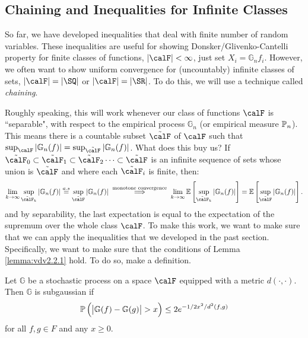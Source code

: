 \subsection{Chaining and Inequalities for Infinite Classes}%

So far, we have developed inequalities that deal with finite number of random variables. These inequalities are useful for showing Donsker/Glivenko-Cantelli property for finite classes of functions, \(|\calF|<\infty\), just set \(X_i = \mathbb{G}_nf_i\). However, we often want to show uniform convergence for (uncountably) infinite classes of sets, \(|\calF| = |\SQ|\) or  \(|\calF|=|\SR|\). To do this, we will use a technique called \textit{chaining}. 

Roughly speaking, this will work whenever our class of functions \(\calF\) is ``separable", with respect to the empirical process \(\mathbb{G}_n\) (or empirical measure \(\P_n\)). This means there is a countable subset \(\tilde\calF\) of  \(\calF\)   such that \(\sup_\calF |\mathbb{G}_n(f)| = \sup_{\tilde\calF} |\mathbb{G}_n(f)|\). What does this buy us? If \(\tilde\calF_0\subset\tilde\calF_1\subset\tilde\calF_2 \dots \subset\tilde\calF\) is an infinite sequence of sets whose union is \(\tilde\calF\) and where each \(\tilde\calF_i\) is finite, then:
 \[
	 \lim_{k\to\infty} \sup_{\tilde\calF_k}|\mathbb{G}_n(f)| \overset{a.s}{=} \sup_{\tilde\calF} |\mathbb{G}_n(f)|\; \overset{\text{monotone convergence}}{\implies}\;\lim_{k\to\infty} \E\left[\sup_{\tilde\calF_k}|\mathbb{G}_n(f)|\right]=\E\left[\sup_{\tilde\calF}|\mathbb{G}_n(f)|\right]
.\] 
and by separability, the last expectation is equal to the expectation of the supremum over the whole class \(\calF\). To make this work, we want to make sure that we can apply the inequalities that we developed in the past section. Specifically, we want to make sure that the conditions of Lemma~ \ref{lemma:vdv2.2.1} hold. To do so, make a definition.

\begin{definition}
	\label{def:subgaussian}
	Let \(\mathbb{G}\) be a stochastic process on a space \(\calF\) equipped with a metric \(d(\cdot,\cdot)\). Then  \(\mathbb{G}\) is subgaussian if
	\begin{equation}
		\label{eq:subgaussian}
		\P\left(\left|\mathbb{G}(f)-\mathbb{G}(g)\right|> x\right)\leq 2e^{-1/2x^2/d^2(f,g)}
	\end{equation}
	for all \(f,g \in F\) and any  \(x\geq 0\).
\end{definition}

